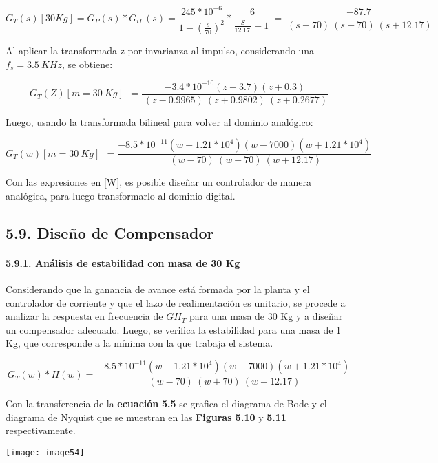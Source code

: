 \documentclass{article} %
\begin{document}
\noindent 
\[G_T(s)[30Kg]=G_P(s)*G_{iL}(s)=\frac{245*{10}^{-6}}{{1-(\frac{s}{70})}^2}*\frac{6}{\frac{S}{12.17\ }+1\ }=\frac{-87.7}{\ (s-70)\ (s+70)\ (s+12.17)}\] 


\noindent Al aplicar la transformada z por invarianza al impulso, considerando una $f_s=3.5\ KHz$, se obtiene:

\noindent 
\[G_T(Z)[m=30\ Kg]\ \ =\frac{-3.4*10^{-10}(z+3.7)(z+0.3)}{\ (z-0.9965)\ (z+0.9802)\ (z+0.2677)}\] 


\noindent Luego, usando la transformada bilineal para volver al dominio anal\'{o}gico:

\noindent 
\[G_T(w)[m=30\ Kg]\ \ =\frac{-8.5*10^{-11}(w-1.21*10^4)(w-7000)(w+1.21*10^4)}{\ (w-70)\ (w+70)\ (w+12.17)}\] 


\noindent Con las expresiones en [W], es posible dise\~{n}ar un controlador de manera anal\'{o}gica, para luego transformarlo al dominio digital.

\noindent 
\subsection{5.9. Dise\~{n}o de Compensador}

\noindent 
\paragraph{5.9.1. An\'{a}lisis de estabilidad con masa de 30 Kg}

\noindent Considerando que la ganancia de avance est\'{a} formada por la planta y el controlador de corriente y que el lazo de realimentaci\'{o}n es unitario, se procede a analizar la respuesta en frecuencia de ${GH}_T$ para una masa de 30 Kg y a dise\~{n}ar un compensador adecuado. Luego, se verifica la estabilidad para una masa de 1 Kg, que corresponde a la m\'{i}nima con la que trabaja el sistema.

\noindent 
\begin{equation} \label{GrindEQ__5_5_} 
G_T(w)*H(w)=\frac{-8.5*10^{-11}(w-1.21*10^4)(w-7000)(w+1.21*10^4)}{\ (w-70)\ (w+70)\ (w+12.17)} 
\end{equation} 


\noindent Con la transferencia de la \textbf{ecuaci\'{o}n} \textbf{ 5.5 }se  grafica el diagrama de Bode y el diagrama de Nyquist que se muestran en las \textbf{Figuras 5.10} y \textbf{5.11} respectivamente.

\noindent 

\noindent \texttt{[image: image54]}
\end{document}
